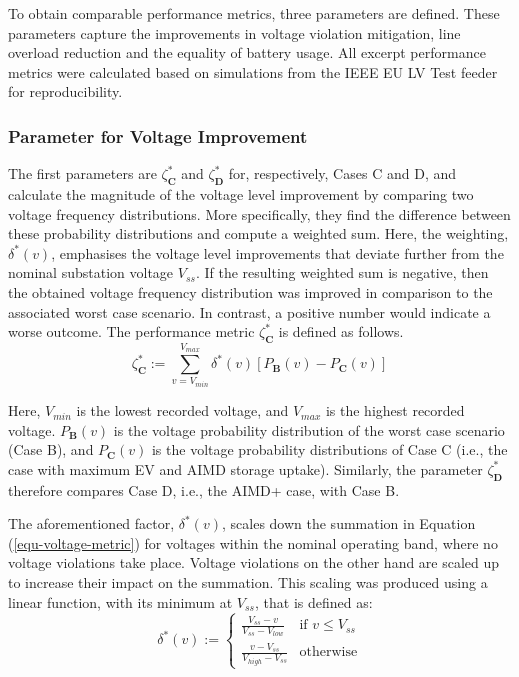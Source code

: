 To obtain comparable performance metrics, three parameters are defined. These parameters capture the improvements in voltage violation mitigation, line overload reduction and the equality of battery usage. All excerpt performance metrics were calculated based on simulations from the IEEE EU LV Test feeder for reproducibility.

\subsubsection{Parameter for Voltage Improvement}

The first parameters are $\zeta^{*}_\textbf{C}$ and $\zeta^{*}_\textbf{D}$ for, respectively, Cases {C} and {D}, and calculate the magnitude of the voltage level improvement by comparing two voltage frequency distributions. More specifically, they find the difference between these probability distributions and compute a weighted sum. Here, the weighting, $\delta^{*}(v)$, emphasises the voltage level improvements that deviate further from the nominal substation voltage $V_{ss}$. If the resulting weighted sum is negative, then the obtained voltage frequency distribution was improved in comparison to the associated worst case scenario. In contrast, a positive number would indicate a worse outcome. The performance metric $\zeta^{*}_\textbf{C}$ is defined as follows.
\begin{equation}
 \zeta^*_\textbf{C} := \sum_{v = V_{min}}^{V_{max}} \delta^{*}(v) \left[P_\textbf{B}(v) - P_\textbf{C}(v)\right]
 \label{equ-voltage-metric}
\end{equation}

Here, $V_{min}$ is the lowest recorded voltage, and $V_{max}$ is the highest recorded voltage. $P_\textbf{B}(v)$ is the voltage probability distribution of the worst case scenario (Case {B}), and $P_\textbf{C}(v)$ is the voltage probability distributions of Case {C} (i.e., the case with maximum EV and AIMD storage uptake). Similarly, the parameter $\zeta_\textbf{D}^*$ therefore compares Case {D}, i.e., the AIMD+ case, with Case {B}.

The aforementioned factor, $\delta^{*}(v)$, scales down the summation in Equation (\ref{equ-voltage-metric}) for voltages within the nominal operating band, where no voltage violations take place. Voltage violations on the other hand are scaled up to increase their impact on the summation. This scaling was produced using a linear function, with its minimum at $V_{ss}$, that is defined as:
\begin{equation}
 \delta^{*}(v) := 
 \begin{cases} 
 \frac{V_{ss} - v}{V_{ss} - V_{low}} & \text{if } v \leq V_{ss} \\
 \frac{v - V_{ss}}{V_{high} - V_{ss}} & \text{otherwise}
 \end{cases}
\end{equation}

